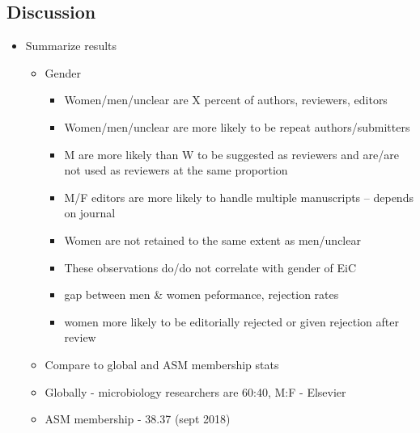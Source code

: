 \documentclass[11pt,]{article}
\providecommand{\tightlist}{%
  \setlength{\itemsep}{0pt}\setlength{\parskip}{0pt}}
\begin{document}
\subsection{Discussion}\label{discussion}

\begin{itemize}
\tightlist
\item
  Summarize results

  \begin{itemize}
  \tightlist
  \item
    Gender

    \begin{itemize}
    \tightlist
    \item
      Women/men/unclear are X percent of authors, reviewers, editors
    \item
      Women/men/unclear are more likely to be repeat authors/submitters
    \item
      M are more likely than W to be suggested as reviewers and are/are
      not used as reviewers at the same proportion
    \item
      M/F editors are more likely to handle multiple manuscripts --
      depends on journal
    \item
      Women are not retained to the same extent as men/unclear
    \item
      These observations do/do not correlate with gender of EiC
    \item
      gap between men \& women peformance, rejection rates
    \item
      women more likely to be editorially rejected or given rejection
      after review
    \end{itemize}
  \item
    Compare to global and ASM membership stats
  \item
    Globally - microbiology researchers are 60:40, M:F - Elsevier
  \item
    ASM membership - 38.37 (sept 2018)
  \end{itemize}
\end{itemize}
\end{document}

